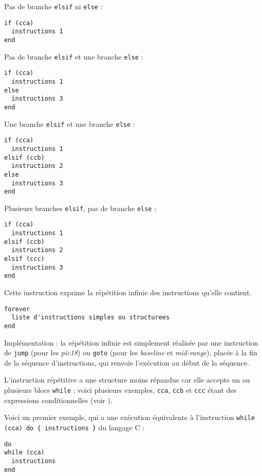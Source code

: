 Pas de branche \texttt{elsif} ni \texttt{else} :
\begin{lstlisting}[language=piccolo]
if (cca)
  instructions 1
end
\end{lstlisting}

Pas de branche \texttt{elsif} et une branche \texttt{else} :
\begin{lstlisting}[language=piccolo]
if (cca)
  instructions 1
else
  instructions 3
end
\end{lstlisting}

Une branche \texttt{elsif} et une branche \texttt{else} :
\begin{lstlisting}[language=piccolo]
if (cca)
  instructions 1
elsif (ccb)
  instructions 2
else
  instructions 3
end
\end{lstlisting}

Plusieurs branches \texttt{elsif}, pas de branche \texttt{else} :
\begin{lstlisting}[language=piccolo]
if (cca)
  instructions 1
elsif (ccb)
  instructions 2
elsif (ccc)
  instructions 3
end
\end{lstlisting}






Cette instruction exprime la répétition infinie des instructions qu'elle contient.
\begin{lstlisting}[language=piccolo]
forever
  liste d'instructions simples ou structurees
end
\end{lstlisting}

Implémentation : la répétition infinie est simplement réalisée par une instruction de \texttt{jump} (pour les \emph{pic18}) ou \texttt{goto} (pour les \emph{baseline} et \emph{mid-range}), placée à la fin de la séquence d'instructions, qui renvoie l'exécution au début de la séquence.










L'instruction répétitive a une structure moins répandue car elle accepte un ou plusieurs blocs \texttt{while} ; voici plusieurs exemples, \texttt{cca}, \texttt{ccb} et \texttt{ccc} étant des expressions conditionnelles (voir ).


Voici un premier exemple, qui a une exécution équivalente à l'instruction \texttt{while (cca) do \{ instructions \}} du langage C :
\begin{lstlisting}[language=piccolo]
do
while (cca)
  instructions
end
\end{lstlisting}

